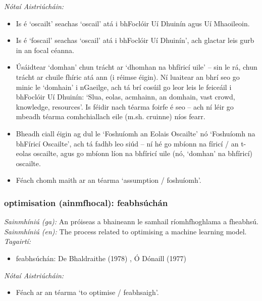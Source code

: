  \noindent \textit{Nótaí Aistriúcháin:}
\begin{itemize}
	\item Is é `oscailt' seachas `oscail' atá i bhFoclóir Uí Dhuinín agus Uí Mhaoileoin.
	\item Is é `foscail' seachas `oscail' atá i bhFoclóir Uí Dhuinín', ach glactar leis gurb in an focal céanna.
	\item Úsáidtear `domhan' chun trácht ar `dhomhan na bhfíricí uile' -- sin le rá, chun trácht ar chuile fhíric atá ann (i réimse éigin). Ní luaitear an bhrí seo go minic le `domhain' i nGaeilge, ach tá brí cosúil go leor leis le feiceáil i bhFoclóir Uí Dhuinín: `Slua, eolas, acmhainn, an domhain, vast crowd, knowledge, resources'. Is féidir nach téarma foirfe é seo -- ach ní léir go mbeadh téarma comhchiallach eile (m.sh. cruinne) níos fearr.
	\item Bheadh ciall éigin ag dul le `Foshuíomh an Eolais Oscailte' nó `Foshuíomh na bhFíricí Oscailte', ach tá fadhb leo siúd -- ní hé go mbíonn na fíricí / an t-eolas oscailte, agus go mbíonn líon na bhfíricí uile (nó, `domhan' na bhfíricí) oscailte.
	\item Féach chomh maith ar an téarma `assumption / foshuíomh'.
\end{itemize}


\subsubsection*{optimisation (ainmfhocal): feabhsúchán}
 \noindent \textit{Sainmhíniú (ga):} An próiseas a bhaineann le samhail ríomhfhoghlama a fheabhsú.
\\
 \noindent \textit{Sainmhíniú (en):} The process related to optimising a machine learning model.
\\
 \noindent \textit{Tagairtí:}
\begin{itemize}
	\item feabhsúchán: De Bhaldraithe (1978) \cite{de-bhaldraithe}, Ó Dónaill (1977) \cite{odonaill}
\end{itemize}

 \noindent \textit{Nótaí Aistriúcháin:}
\begin{itemize}
	\item Féach ar an téarma `to optimise / feabhsaigh'.
\end{itemize}



